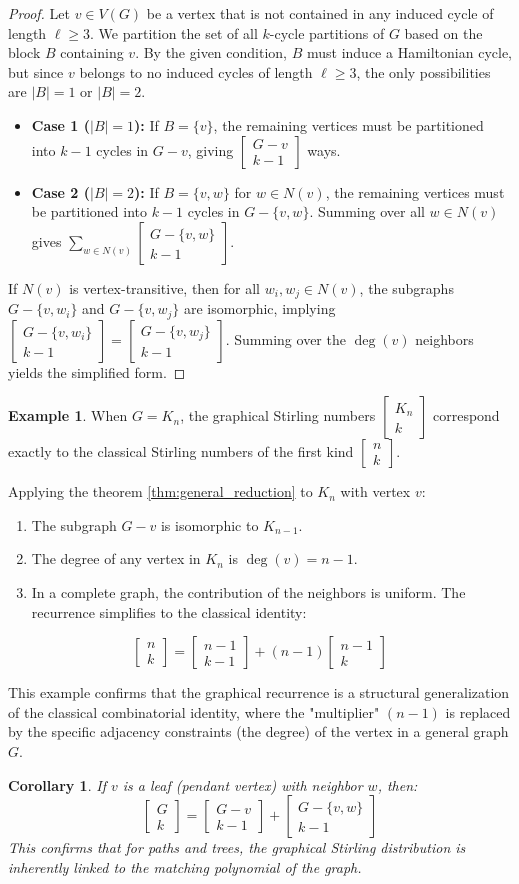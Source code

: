 \documentclass{amsart}
\newtheorem{corollary}[theorem]{Corollary}
\theoremstyle{definition}
\newtheorem{example}[theorem]{Example}
\def\st#1#2{\begin{bmatrix} #1 \\ #2 \end{bmatrix}}
\begin{document}
\begin{proof}
Let $v \in V(G)$ be a vertex that is not contained in any induced cycle of length $\ell \geq 3$. We partition the set of all $k$-cycle partitions of $G$ based on the block $B$ containing $v$. By the given condition, $B$ must induce a Hamiltonian cycle, but since $v$ belongs to no induced cycles of length $\ell \geq 3$, the only possibilities are $|B|=1$ or $|B|=2$.

\begin{itemize}
    \item \textbf{Case 1 ($|B|=1$):} If $B=\{v\}$, the remaining vertices must be partitioned into $k-1$ cycles in $G-v$, giving $\st{G-v}{k-1}$ ways.
    \item \textbf{Case 2 ($|B|=2$):} If $B=\{v,w\}$ for $w \in N(v)$, the remaining vertices must be partitioned into $k-1$ cycles in $G-\{v,w\}$. Summing over all $w \in N(v)$ gives $\sum_{w \in N(v)} \st{G - \{v,w\}}{k - 1}$.
\end{itemize}
If $N(v)$ is vertex-transitive, then for all $w_i, w_j \in N(v)$, the subgraphs $G - \{v, w_i\}$ and $G - \{v, w_j\}$ are isomorphic, implying $\st{G - \{v, w_i\}}{k-1} = \st{G - \{v, w_j\}}{k-1}$. Summing over the $\deg(v)$ neighbors yields the simplified form.
\end{proof}
\begin{example}

When $G = K_n$, the graphical Stirling numbers $\st{K_n}{k}$ correspond exactly to the classical Stirling numbers of the first kind $\st{n}{k}$. 

Applying the theorem \ref{thm:general_reduction} to $K_n$ with vertex $v$:
\begin{enumerate}
    \item The subgraph $G-v$ is isomorphic to $K_{n-1}$.
    \item The degree of any vertex in $K_n$ is $\deg(v) = n-1$.
    \item In a complete graph, the contribution of the neighbors is uniform. The recurrence simplifies to the classical identity:
\end{enumerate}

\begin{equation*}
    \st{n}{k} = \st{n-1}{k-1} + (n-1) \st{n-1}{k}
\end{equation*}



This example confirms that the graphical recurrence is a structural generalization of the classical combinatorial identity, where the "multiplier" $(n-1)$ is replaced by the specific adjacency constraints (the degree) of the vertex in a general graph $G$.
\end{example}
\begin{corollary}
If $v$ is a leaf (pendant vertex) with neighbor $w$, then:
\begin{equation*}
    \st{G}{k} = \st{G-v}{k-1} + \st{G-\{v,w\}}{k-1}
\end{equation*}
This confirms that for paths and trees, the graphical Stirling distribution is inherently linked to the matching polynomial of the graph.
\end{corollary}
\end{document}
